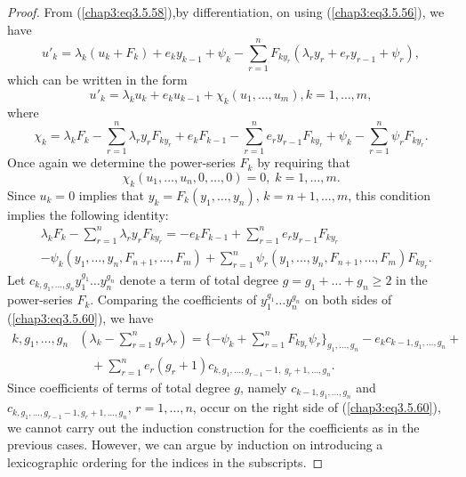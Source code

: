 \begin{proof}
From (\ref{chap3:eq3.5.58}),\pageoriginale by differentiation, on
using (\ref{chap3:eq3.5.56}), we have 
$$
u'_k  = \lambda_k (u_k + F_k) + e_k y_{k-1} + \psi_k -
\sum\limits^n_{r=1} F_{ky_r} (\lambda_r y_r + e_r y_{r-1} + \psi_r),  
$$
which can be written in the form
$$
u'_k = \lambda_k u_k + e_k u_{k-1} + \chi_k (u_1, \ldots, u_m), k =1, \ldots, m,
$$
where 
\begin{equation*}
\chi_k = \lambda_k F_k - \sum\limits^n_{r=1} \lambda_r y_r F_{ky_r} +
e_k F_{k-1} - \sum\limits^n_{r=1} e_r y_{r-1} F_{ky_r} + \psi_k -
\sum\limits^n_{r=1}\psi_r F_{ky_r}.  
\tag{3.5.59}\label{chap3:eq3.5.59}
\end{equation*}
Once again we determine the power-series $F_k$ by requiring that 
$$
\chi_k (u_1, \ldots, u_n, 0, \ldots, 0 )  =0 , \; k =1,\ldots, m.
$$
Since $u_k=0$ implies that $y_k = F_k (y_1, \ldots, y_n)$, $k
=n+1,\ldots, m$, this condition implies the following identity: 
\begin{align*}
& \lambda_k F_k - \sum\limits^n_{r=1} \lambda_r y_r F_{ky_r} = - e_k
  F_{k-1} + \sum\limits^n_{r=1} e_r y_{r-1} F_{ky_r} \\ 
& - \psi_k (y_1, \ldots, y_n, F_{n+1}, \ldots, F_m) +
  \sum\limits^n_{r=1} \psi_r (y_1, \ldots, y_n, F_{n+1}, \ldots, F_m)
  F_{ky_r}. \tag{3.5.60}\label{chap3:eq3.5.60} 
\end{align*}
Let $c_{k, g_1,\ldots, g_n} y^{g_1}_1 \ldots y^{g_n}_n$ denote a term
of total degree $g = g_1+\ldots + g_n \geq 2 $ in the power-series
$F_k$. Comparing the coefficients of $y^{g_1}_1 \ldots y^{g_n}_n$ on
both sides of (\ref{chap3:eq3.5.60}), we have  
\begin{align*}
 {k, g_1, \ldots, g_n} &  \left(\lambda_k - \sum\limits^n_{r=1} g_r
 \lambda_r \right) =\{-\psi_k + \sum\limits^n_{r=1} F_{ky_r}
 \psi_r\}_{g_1, \ldots, g_n} - e_k c_{k-1, g_1, \ldots, g_n} + \\ 
& \quad + \sum\limits^n_{r=1} e_r (g_r+1) c_{k, g_1, \ldots, g_{r-1}
   -1, \; g_r + 1, \ldots, g_n}.  
\tag{3.5.61}\label{chap3:eq3.5.61}
\end{align*}\pageoriginale
Since coefficients of terms of total degree $g$, namely $c_{k-1, g_1,
  \ldots, g_n}$ and $c_{k, g_1, \ldots, g_{r-1} -1, g_{r} + 1, \ldots,
  g_n}$, $r =1,\ldots,n$, occur on the right side of
(\ref{chap3:eq3.5.60}), we cannot carry out the induction construction
for the coefficients as in the previous cases. However, we can argue
by induction on introducing a lexicographic ordering for the indices
in the subscripts. 


\end{proof}
